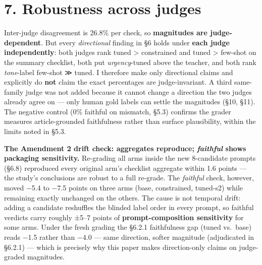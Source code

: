 \documentclass[11pt]{article}
\begin{document}
\section{7. Robustness across judges}\label{robustness-across-judges}

Inter-judge disagreement is 26.8\% per check, so \textbf{magnitudes are
judge-dependent}. But every \emph{directional} finding in §6 holds under
\textbf{each judge independently}: both judges rank tuned \textgreater{}
constrained and tuned \textgreater{} few-shot on the summary checklist,
both put \emph{urgency}-tuned above the teacher, and both rank
\emph{tone}-label few-shot ≫ tuned. I therefore make only directional
claims and explicitly do \textbf{not} claim the exact percentages are
judge-invariant. A third same-family judge was not added because it
cannot change a direction the two judges already agree on --- only human
gold labels can settle the magnitudes (§10, §11). The negative control
(0\% faithful on mismatch, §5.3) confirms the grader measures
article-grounded faithfulness rather than surface plausibility, within
the limits noted in §5.3.

\textbf{The Amendment 2 drift check: aggregates reproduce;
\emph{faithful} shows packaging sensitivity.} Re-grading all arms inside
the new 8-candidate prompts (§6.8) reproduced every original arm's
checklist aggregate within 1.6 points --- the study's conclusions are
robust to a full re-grade. The \emph{faithful} check, however, moved
−5.4 to −7.5 points on three arms (base, constrained, tuned-s2) while
remaining exactly unchanged on the others. The cause is not temporal
drift: adding a candidate reshuffles the blinded label order in every
prompt, so faithful verdicts carry roughly ±5--7 points of
\textbf{prompt-composition sensitivity} for some arms. Under the fresh
grading the §6.2.1 faithfulness gap (tuned vs.~base) reads −1.5 rather
than −4.0 --- same direction, softer magnitude (adjudicated in §6.2.1)
--- which is precisely why this paper makes direction-only claims on
judge-graded magnitudes.
\end{document}
